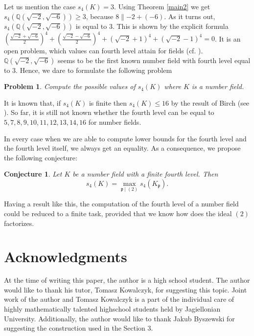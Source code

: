 \documentclass[12pt]{article}
\newtheorem{conj}[thm]{Conjecture}
\newtheorem{prob}[thm]{Problem}
\theoremstyle{remark}
\begin{document}
Let us mention the case $s_4(K)=3$. Using Theorem \ref{main2} we get $s_4(\mathbb{Q}(\sqrt{-2},\sqrt{-6})) \geq 3$, because $8 \parallel -2 + (-6)$. As it turns out, $s_4(\mathbb{Q}(\sqrt{-2},\sqrt{-6}))$ is equal to 3. This is shown by the explicit formula $ \left(\frac{\sqrt{-2} + \sqrt{-6}}{2} \right)^4 + \left(\frac{\sqrt{-2} - \sqrt{-6}}{2} \right)^4 + \left(\sqrt{-2}+1\right)^4 + \left(\sqrt{-2}-1 \right)^4 = 0$. It is an open problem, which values can fourth level attain for fields (cf. \cite{hoffmann2014}). $\mathbb{Q}(\sqrt{-2},\sqrt{-6})$ seems to be the first known number field with fourth level equal to 3. Hence, we dare to formulate the following problem
\begin{prob}
Compute the possible values of $s_4(K)$ where $K$ is a number field.

\end{prob}
It is known that, if $s_4(K)$ is finite then $s_4(K) \leq 16$ by the result of Birch (see \cite{paper-per-piotr}). So far, it is still not known whether the fourth level can be equal to $5,7,8,9,10,11,12,13,14,16$ for number fields.

In every case when we are able to compute lower bounds for the fourth level and the fourth level itself, we always get an equality. As a consequence, we propose the following conjecture:

\begin{conj}
Let $K$ be a number field with a finite fourth level. Then
$$s_4(K)= \max_{\mathfrak{p} \mid (2)} s_4(K_\mathfrak{p}).$$
\end{conj}
Having a result like this, the computation of the fourth level of a number field could be reduced to a finite task, provided that we know how does the ideal $(2)$ factorizes.


\section{Acknowledgments}
At the time of writing this paper, the author is a high school student. The author would like to thank his tutor, Tomasz Kowalczyk, for suggesting this topic. Joint work of the author and Tomasz Kowalczyk is a part of the individual care of highly mathematically talented highschool students held by Jagiellonian University. Additionally, the author would like to thank Jakub Byszewski for suggesting the construction used in the Section 3.
\end{document}
